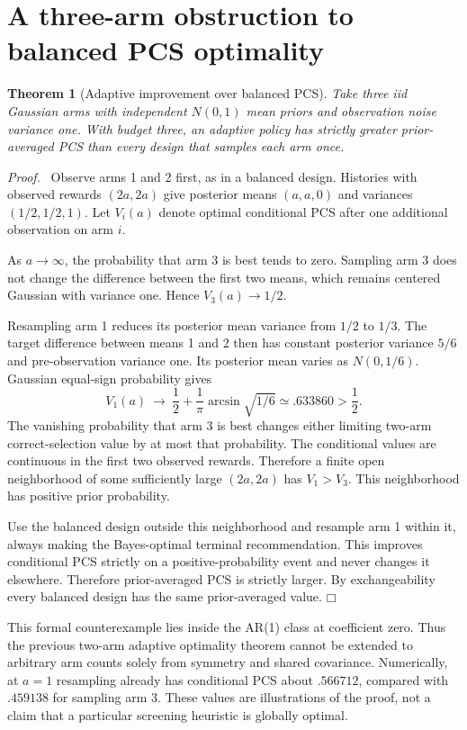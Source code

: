 \documentclass[11pt]{article}
\newtheorem{theorem}{Theorem}
\newenvironment{proof}{\par\noindent\textit{Proof.}\ }{\hfill$\mdlgwhtsquare$\par\medskip}
\begin{document}
\section{A three-arm obstruction to balanced PCS optimality}
\begin{theorem}[Adaptive improvement over balanced PCS]
Take three iid Gaussian arms with independent $N(0,1)$ mean priors and observation noise variance one. With budget three, an adaptive policy has strictly greater prior-averaged PCS than every design that samples each arm once.
\end{theorem}
\begin{proof}
Observe arms 1 and 2 first, as in a balanced design. Histories with observed rewards $(2a,2a)$ give posterior means $(a,a,0)$ and variances $(1/2,1/2,1)$. Let $V_i(a)$ denote optimal conditional PCS after one additional observation on arm $i$.

As $a\to\infty$, the probability that arm 3 is best tends to zero. Sampling arm 3 does not change the difference between the first two means, which remains centered Gaussian with variance one. Hence $V_3(a)\to1/2$.

Resampling arm 1 reduces its posterior mean variance from $1/2$ to $1/3$. The target difference between means 1 and 2 then has constant posterior variance $5/6$ and pre-observation variance one. Its posterior mean varies as $N(0,1/6)$. Gaussian equal-sign probability gives
\[
V_1(a)\ \longrightarrow\ \frac12+\frac1\pi\arcsin\sqrt{1/6}
\simeq .633860>\frac12.
\]
The vanishing probability that arm 3 is best changes either limiting two-arm correct-selection value by at most that probability. The conditional values are continuous in the first two observed rewards. Therefore a finite open neighborhood of some sufficiently large $(2a,2a)$ has $V_1>V_3$. This neighborhood has positive prior probability.

Use the balanced design outside this neighborhood and resample arm 1 within it, always making the Bayes-optimal terminal recommendation. This improves conditional PCS strictly on a positive-probability event and never changes it elsewhere. Therefore prior-averaged PCS is strictly larger. By exchangeability every balanced design has the same prior-averaged value.
\end{proof}

This formal counterexample lies inside the AR(1) class at coefficient zero. Thus the previous two-arm adaptive optimality theorem cannot be extended to arbitrary arm counts solely from symmetry and shared covariance. Numerically, at $a=1$ resampling already has conditional PCS about $.566712$, compared with $.459138$ for sampling arm 3. These values are illustrations of the proof, not a claim that a particular screening heuristic is globally optimal.
\end{document}
